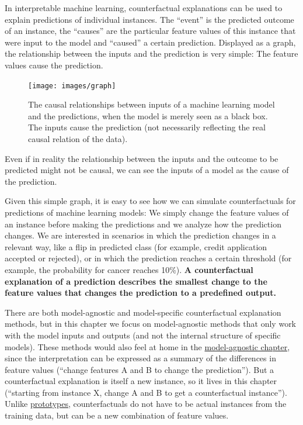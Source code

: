 \documentclass[
  10pt,
]{scrbook}
\begin{document}
In interpretable machine learning, counterfactual explanations can be used to explain predictions of individual instances.
The ``event'' is the predicted outcome of an instance, the ``causes'' are the particular feature values of this instance that were input to the model and ``caused'' a certain prediction.
Displayed as a graph, the relationship between the inputs and the prediction is very simple:
The feature values cause the prediction.

\begin{figure}

{\centering \texttt{[image: images/graph]} 

}

\caption{The causal relationships between inputs of a machine learning model and the predictions, when the model is merely seen as a black box. The inputs cause the prediction (not necessarily reflecting the real causal relation of the data).}\label{fig:ml-graph-cf}
\end{figure}

Even if in reality the relationship between the inputs and the outcome to be predicted might not be causal, we can see the inputs of a model as the cause of the prediction.

Given this simple graph, it is easy to see how we can simulate counterfactuals for predictions of machine learning models:
We simply change the feature values of an instance before making the predictions and we analyze how the prediction changes.
We are interested in scenarios in which the prediction changes in a relevant way, like a flip in predicted class (for example, credit application accepted or rejected), or in which the prediction reaches a certain threshold (for example, the probability for cancer reaches 10\%).
\textbf{A counterfactual explanation of a prediction describes the smallest change to the feature values that changes the prediction to a predefined output.}

There are both model-agnostic and model-specific counterfactual explanation methods, but in this chapter we focus on model-agnostic methods that only work with the model inputs and outputs (and not the internal structure of specific models).
These methods would also feel at home in the \protect\hyperlink{agnostic}{model-agnostic chapter}, since the interpretation can be expressed as a summary of the differences in feature values (``change features A and B to change the prediction'').
But a counterfactual explanation is itself a new instance, so it lives in this chapter (``starting from instance X, change A and B to get a counterfactual instance'').
Unlike \protect\hyperlink{proto}{prototypes}, counterfactuals do not have to be actual instances from the training data, but can be a new combination of feature values.
\end{document}
